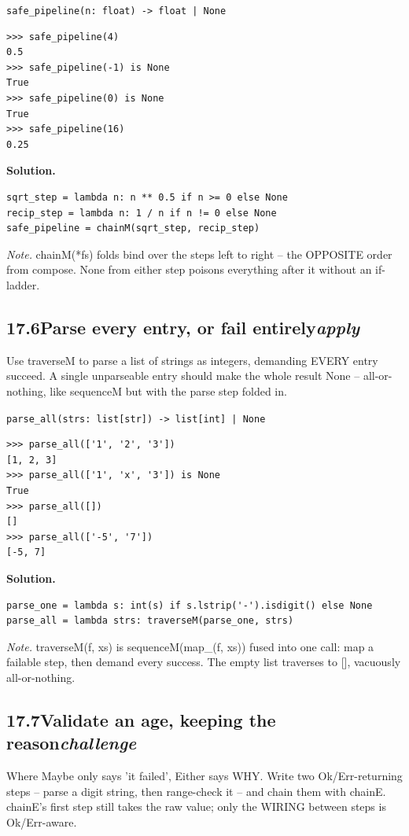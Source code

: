 \documentclass[10pt,letterpaper]{book}
\begin{document}
\noindent\texttt{safe\_pipeline(n: float) -> float | None}
\begin{lstlisting}[style=ex]
>>> safe_pipeline(4)
0.5
>>> safe_pipeline(-1) is None
True
>>> safe_pipeline(0) is None
True
>>> safe_pipeline(16)
0.25
\end{lstlisting}
\noindent\textbf{Solution.}
\begin{lstlisting}[style=code]
sqrt_step = lambda n: n ** 0.5 if n >= 0 else None
recip_step = lambda n: 1 / n if n != 0 else None
safe_pipeline = chainM(sqrt_step, recip_step)
\end{lstlisting}
\noindent\textit{Note.} chainM(*fs) folds bind over the steps left to right -- the OPPOSITE order from compose. None from either step poisons everything after it without an if-ladder.

\subsection*{17.6\quad Parse every entry, or fail entirely\hfill\textnormal{\textit{apply}}}
Use traverseM to parse a list of strings as integers, demanding EVERY entry succeed. A single unparseable entry should make the whole result None -- all-or-nothing, like sequenceM but with the parse step folded in.

\noindent\texttt{parse\_all(strs: list[str]) -> list[int] | None}
\begin{lstlisting}[style=ex]
>>> parse_all(['1', '2', '3'])
[1, 2, 3]
>>> parse_all(['1', 'x', '3']) is None
True
>>> parse_all([])
[]
>>> parse_all(['-5', '7'])
[-5, 7]
\end{lstlisting}
\noindent\textbf{Solution.}
\begin{lstlisting}[style=code]
parse_one = lambda s: int(s) if s.lstrip('-').isdigit() else None
parse_all = lambda strs: traverseM(parse_one, strs)
\end{lstlisting}
\noindent\textit{Note.} traverseM(f, xs) is sequenceM(map\_(f, xs)) fused into one call: map a failable step, then demand every success. The empty list traverses to [], vacuously all-or-nothing.

\subsection*{17.7\quad Validate an age, keeping the reason\hfill\textnormal{\textit{challenge}}}
Where Maybe only says 'it failed', Either says WHY. Write two Ok/Err-returning steps -- parse a digit string, then range-check it -- and chain them with chainE. chainE's first step still takes the raw value; only the WIRING between steps is Ok/Err-aware.
\end{document}
